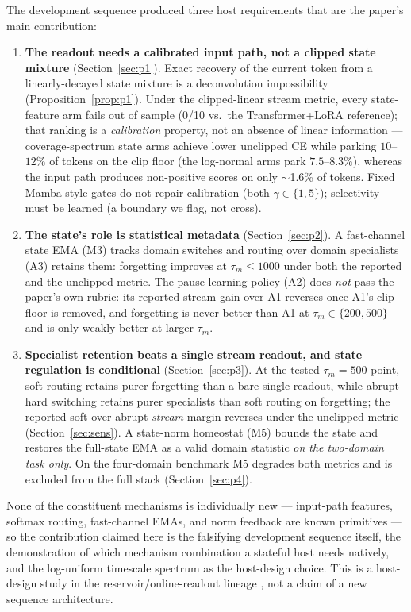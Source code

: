 \documentclass[preprint,12pt]{elsarticle}
\begin{document}
The development sequence produced three host requirements that are
the paper's main contribution:

\begin{enumerate}
\item \textbf{The readout needs a calibrated input path, not a
   clipped state mixture}
   (Section~\ref{sec:p1}). Exact recovery of the current token from a
   linearly-decayed state mixture is a deconvolution impossibility
   (Proposition~\ref{prop:p1}). Under the clipped-linear stream metric,
   every state-feature arm fails out of sample (0/10 vs.\ the
   Transformer+LoRA reference); that ranking is a \emph{calibration}
   property, not an absence of linear information --- coverage-spectrum
   state arms achieve lower unclipped CE while parking $10$--$12\%$ of
   tokens on the clip floor (the log-normal arms park $7.5$--$8.3\%$),
   whereas the input path produces
   non-positive scores on only $\sim$1.6\% of tokens. Fixed Mamba-style
   gates do not repair calibration (both $\gamma\in\{1,5\}$); selectivity
   must be learned (a boundary we flag, not cross).
\item \textbf{The state's role is statistical metadata}
   (Section~\ref{sec:p2}). A fast-channel state EMA (M3) tracks domain
   switches and routing over domain specialists (A3) retains them:
   forgetting improves at $\tau_m\le1000$ under both the reported and
   the unclipped metric. The pause-learning policy (A2) does \emph{not}
   pass the paper's own rubric: its reported stream gain over A1
   reverses once A1's clip floor is removed, and forgetting is never
   better than A1 at $\tau_m\in\{200,500\}$ and is only weakly better
   at larger $\tau_m$.
\item \textbf{Specialist retention beats a single stream readout, and
   state regulation is conditional}
   (Section~\ref{sec:p3}). At the tested $\tau_m{=}500$ point, soft
   routing retains purer forgetting than a bare single readout, while
   abrupt hard switching retains purer specialists than soft routing
   on forgetting; the reported soft-over-abrupt \emph{stream} margin
   reverses under the unclipped metric (Section~\ref{sec:sens}). A
   state-norm homeostat (M5) bounds the state and restores the
   full-state EMA as a valid domain statistic \emph{on the two-domain
   task only}. On the four-domain benchmark M5 degrades both metrics
   and is excluded from the full stack (Section~\ref{sec:p4}).
\end{enumerate}

None of the constituent mechanisms is individually new --- input-path
features, softmax routing, fast-channel EMAs, and norm feedback are
known primitives --- so the contribution claimed here is the
falsifying development sequence itself, the demonstration of which
mechanism combination a stateful host needs natively, and the
log-uniform timescale spectrum as the host-design choice. This is a
host-design study in the reservoir/online-readout lineage
\cite{jaeger2001esn,jaeger2004science,maass2002lsm}, not a claim of a
new sequence architecture.
\end{document}
